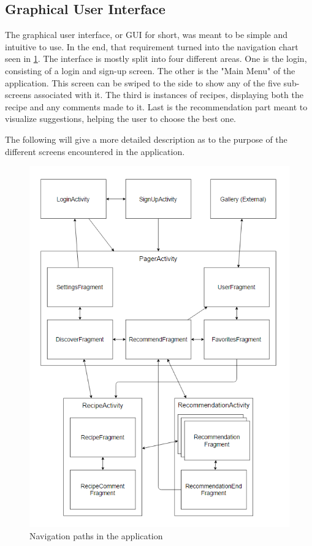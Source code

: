 \subsection{Graphical User Interface}
\label{subsec:gui}

The graphical user interface, or GUI for short, was meant to be simple and intuitive to use. In the end, that requirement turned into the navigation chart seen in \ref{fig:application_navigation}. The interface is mostly split into four different areas. One is the login, consisting of a login and sign-up screen. The other is the "Main Menu" of the application. This screen can be swiped to the side to show any of the five sub-screens associated with it. The third is instances of recipes, displaying both the recipe and any comments made to it. Last is the recommendation part meant to visualize suggestions, helping the user to choose the best one.

The following will give a more detailed description as to the purpose of the different screens encountered in the application.

\begin{figure}[H]
	\centering
	\includegraphics[width=\textwidth]{Pictures/application_navigation.png}
	\caption{Navigation paths in the application}
	\label{fig:application_navigation}
\end{figure}

